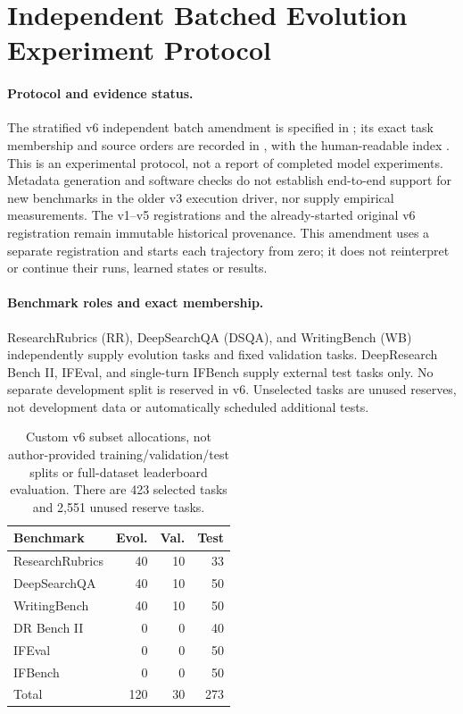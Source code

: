 \section{Independent Batched Evolution Experiment Protocol}
\label{app:concrete-protocol}

\paragraph{Protocol and evidence status.}
The stratified v6 independent batch amendment is specified in
; its exact task membership
and source orders are recorded in ,
with the human-readable index .
This is an experimental
protocol, not a report of completed model experiments. Metadata generation
and software checks do not establish end-to-end support for new benchmarks
in the older v3 execution driver, nor supply empirical measurements.
The v1--v5 registrations and the already-started original v6 registration
remain immutable historical provenance. This amendment uses a separate
registration and starts each trajectory from zero; it does not reinterpret
or continue their runs, learned states or results.

\paragraph{Benchmark roles and exact membership.}
ResearchRubrics (RR), DeepSearchQA (DSQA), and WritingBench (WB) independently
supply evolution tasks and fixed validation tasks. DeepResearch Bench II,
IFEval, and single-turn IFBench supply external test tasks only. No separate
development split is reserved in v6. Unselected tasks are unused reserves,
not development data or automatically scheduled additional tests.

\begin{table}[t]
\centering\small
\begin{tabular}{@{}lrrr@{}}
\toprule
Benchmark & Evol. & Val. & Test \\
\midrule
ResearchRubrics & 40 & 10 & 33 \\
DeepSearchQA & 40 & 10 & 50 \\
WritingBench & 40 & 10 & 50 \\
DR Bench II & 0 & 0 & 40 \\
IFEval & 0 & 0 & 50 \\
IFBench & 0 & 0 & 50 \\
\midrule
Total & 120 & 30 & 273 \\
\bottomrule
\end{tabular}
\caption{Custom v6 subset allocations, not author-provided
training/validation/test splits or full-dataset leaderboard evaluation.
There are 423 selected tasks and 2,551 unused reserve tasks.}
\label{tab:benchmark-subsets}
\end{table}

